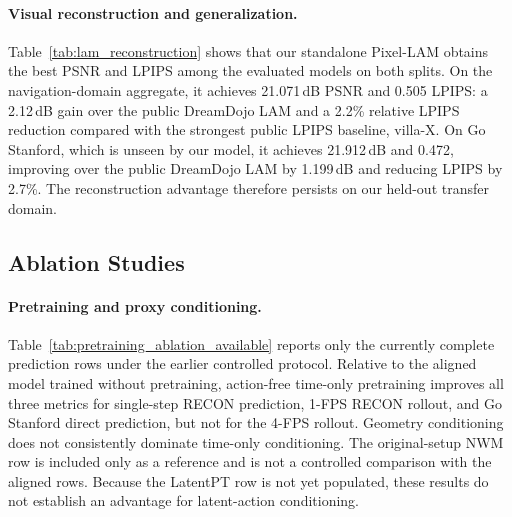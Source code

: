 

\paragraph{Visual reconstruction and generalization.}
Table~\ref{tab:lam_reconstruction} shows that our standalone Pixel-LAM obtains
the best PSNR and LPIPS among the evaluated models on both splits.  On the
navigation-domain aggregate, it achieves 21.071\,dB PSNR and 0.505 LPIPS: a
2.12\,dB gain over the public DreamDojo LAM and a 2.2\% relative LPIPS
reduction compared with the strongest public LPIPS baseline, villa-X.  On Go
Stanford, which is unseen by our model, it achieves 21.912\,dB and 0.472,
improving over the public DreamDojo LAM by 1.199\,dB and reducing LPIPS by
2.7\%.  The reconstruction advantage therefore persists on our held-out
transfer domain.

\subsection{Ablation Studies}



\paragraph{Pretraining and proxy conditioning.}
Table~\ref{tab:pretraining_ablation_available} reports only the currently
complete prediction rows under the earlier controlled protocol.  Relative to
the aligned model trained without pretraining, action-free time-only
pretraining improves all three metrics for single-step RECON prediction,
1-FPS RECON rollout, and Go Stanford direct prediction, but not for the 4-FPS
rollout.  Geometry conditioning does not consistently dominate time-only
conditioning.  The original-setup NWM row is included only as a reference and
is not a controlled comparison with the aligned rows.  Because the LatentPT
row is not yet populated, these results do not establish an advantage for
latent-action conditioning.

